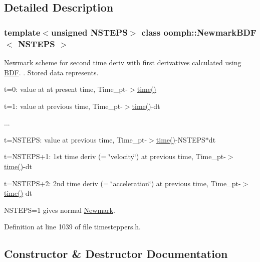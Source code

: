 \subsection{Detailed Description}
\subsubsection*{template$<$unsigned N\+S\+T\+E\+PS$>$\newline
class oomph\+::\+Newmark\+B\+D\+F$<$ N\+S\+T\+E\+P\+S $>$}

\hyperlink{classoomph_1_1Newmark}{Newmark} scheme for second time deriv with first derivatives calculated using \hyperlink{classoomph_1_1BDF}{B\+DF}. . Stored data represents. 


\begin{DoxyItemize}
\item t=0\+: value at at present time, Time\+\_\+pt-\/$>$\hyperlink{classoomph_1_1TimeStepper_ab902086340e6b33c5114db30c1f644c1}{time()}
\item t=1\+: value at previous time, Time\+\_\+pt-\/$>$\hyperlink{classoomph_1_1TimeStepper_ab902086340e6b33c5114db30c1f644c1}{time()}-\/dt
\item ...
\item t=N\+S\+T\+E\+PS\+: value at previous time, Time\+\_\+pt-\/$>$\hyperlink{classoomph_1_1TimeStepper_ab902086340e6b33c5114db30c1f644c1}{time()}-\/\+N\+S\+T\+E\+P\+S$\ast$dt
\item t=N\+S\+T\+E\+P\+S+1\+: 1st time deriv (= \char`\"{}velocity\char`\"{}) at previous time, Time\+\_\+pt-\/$>$\hyperlink{classoomph_1_1TimeStepper_ab902086340e6b33c5114db30c1f644c1}{time()}-\/dt
\item t=N\+S\+T\+E\+P\+S+2\+: 2nd time deriv (= \char`\"{}acceleration\char`\"{}) at previous time, Time\+\_\+pt-\/$>$\hyperlink{classoomph_1_1TimeStepper_ab902086340e6b33c5114db30c1f644c1}{time()}-\/dt
\end{DoxyItemize}

N\+S\+T\+E\+PS=1 gives normal \hyperlink{classoomph_1_1Newmark}{Newmark}. 

Definition at line 1039 of file timesteppers.\+h.



\subsection{Constructor \& Destructor Documentation}
\mbox{\label{classoomph_1_1NewmarkBDF_aa816cebef30ae6149297a9d325946649}} 
